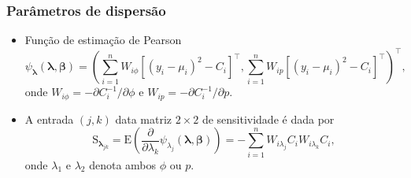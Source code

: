 \documentclass[10pt, aspectratio=169]{beamer}\usepackage[]{graphicx}\usepackage[]{color}
\begin{document}
\begin{frame}[c]
\frametitle{Parâmetros de dispersão}
\begin{itemize}
\item Função de estimação de Pearson
\begin{equation*}
\label{Pearson}
\psi_{\boldsymbol{\lambda}}(\boldsymbol{\lambda}, \boldsymbol{\beta}) = \left (\sum_{i=1}^n W_{i \phi} \left [ (y_i - \mu_i)^2 - C_i \right ]^\top, \sum_{i=1}^n W_{i p} \left [ (y_i - \mu_i)^2 - C_i \right ]^\top  \right )^\top,
\end{equation*}
onde $W_{i \phi} = - \partial C^{-1}_i/\partial \phi$ e $W_{i p} = - \partial C^{-1}_i/\partial p$.
\item A entrada $(j,k)$ data matriz $2 \times 2$ de sensitividade é dada por 
\begin{equation}
\label{Slambda}
\mathrm{S}_{\boldsymbol{\lambda}_{jk}} = \mathrm{E}\left ( \frac{\partial}{\partial \lambda_k}\psi_{\lambda_j}(\boldsymbol{\lambda}, \boldsymbol{\beta})  \right ) = -\sum_{i=1}^n W_{i \lambda_j} C_i W_{i\lambda_k}C_i, 
\end{equation}
onde $\lambda_1$ e $\lambda_2$ denota ambos $\phi$ ou $p$.
\end{itemize}
\end{frame}
\end{document}
